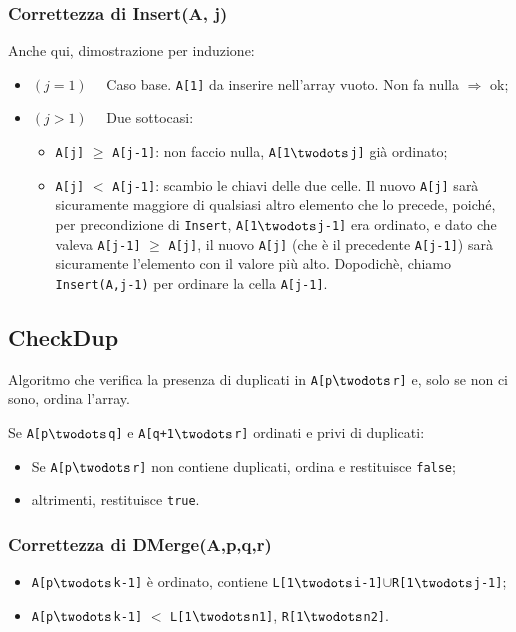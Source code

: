 \subsubsection{Correttezza di Insert(A, j)}
Anche qui, dimostrazione per induzione:
\begin{itemize}
	\item[] $(j = 1) \quad$ Caso base. \texttt{A[1]} da inserire nell'array vuoto. Non fa nulla
	$\Rightarrow$ ok;
	\item[] $(j > 1) \quad$ Due sottocasi:
	\begin{itemize}
		\item \texttt{A[j]} $\geq$ \texttt{A[j-1]}: non faccio nulla, \texttt{A[1$\twodots$j]} già
		ordinato;
		\item \texttt{A[j]} $<$ \texttt{A[j-1]}: scambio le chiavi delle due celle. Il nuovo \texttt{A[j]}
		sarà sicuramente maggiore di qualsiasi altro elemento che lo precede, poiché, per precondizione di 
		\texttt{Insert}, \texttt{A[1$\twodots$j-1]} era ordinato, e dato che valeva \texttt{A[j-1]} $\geq$ 
		\texttt{A[j]}, il nuovo \texttt{A[j]} (che è il precedente \texttt{A[j-1]}) sarà sicuramente l'elemento con il valore più alto. 
		Dopodichè, chiamo \texttt{Insert(A,j-1)} per ordinare la cella \texttt{A[j-1]}.
 	\end{itemize}
\end{itemize}
 
\subsection{CheckDup}
Algoritmo che verifica la presenza di duplicati in \texttt{A[p$\twodots$r]} e, 
solo se non ci sono, ordina l'array.

Se \texttt{A[p$\twodots$q]} e \texttt{A[q+1$\twodots$r]} ordinati e privi di duplicati:
\begin{itemize}[noitemsep]
	\item Se \texttt{A[p$\twodots$r]} non contiene duplicati, ordina e restituisce \texttt{false};
	\item altrimenti, restituisce \texttt{true}.
\end{itemize}





\subsubsection{Correttezza di DMerge(A,p,q,r)}
\begin{itemize}
	\item \texttt{A[p$\twodots$k-1]} è ordinato, contiene \texttt{L[1$\twodots$i-1]}$\cup$\texttt{R[1$\twodots$j-1]};
	\item \texttt{A[p$\twodots$k-1]} $<$ \texttt{L[1$\twodots$n1]}, \texttt{R[1$\twodots$n2]}.
\end{itemize}

